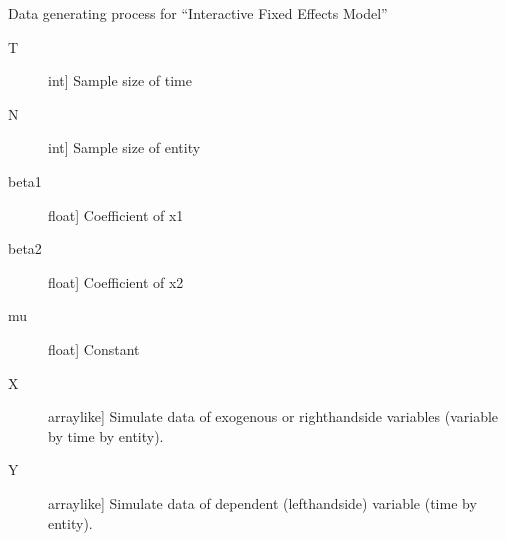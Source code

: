 \documentclass[a4paper,11pt,english]{sphinxmanual}
\begin{document}
\begin{fulllineitems}
\label{\detokenize{analysis:src.analysis.monte_carlo_dgp.dgp_interactive_fixed_effects_model}}
\sphinxAtStartPar
Data generating process for “Interactive Fixed Effects Model”
\begin{description}
\item[{T}] \leavevmode{[}int{]}
\sphinxAtStartPar
Sample size of time

\item[{N}] \leavevmode{[}int{]}
\sphinxAtStartPar
Sample size of entity

\item[{beta1}] \leavevmode{[}float{]}
\sphinxAtStartPar
Coefficient of x1

\item[{beta2}] \leavevmode{[}float{]}
\sphinxAtStartPar
Coefficient of x2

\item[{mu}] \leavevmode{[}float{]}
\sphinxAtStartPar
Constant

\end{description}
\begin{description}
\item[{X}] \leavevmode{[}array\sphinxhyphen{}like{]}
\sphinxAtStartPar
Simulate data of exogenous or right\sphinxhyphen{}hand\sphinxhyphen{}side variables (variable by time by
entity).

\item[{Y}] \leavevmode{[}array\sphinxhyphen{}like{]}
\sphinxAtStartPar
Simulate data of dependent (left\sphinxhyphen{}hand\sphinxhyphen{}side) variable (time by entity).


\end{description}
\end{fulllineitems}
\end{document}
